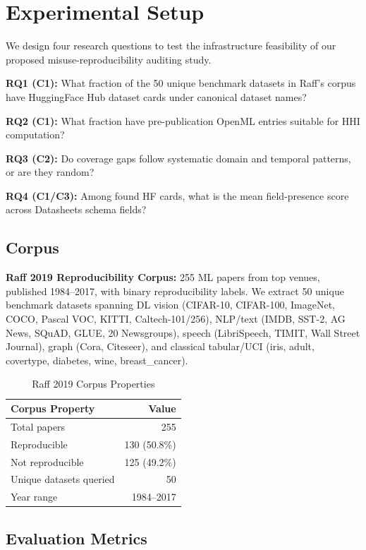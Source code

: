 \section{Experimental Setup}
\label{sec:experiments}

We design four research questions to test the infrastructure feasibility of our proposed misuse-reproducibility auditing study.

\textbf{RQ1 (C1):} What fraction of the 50 unique benchmark datasets in Raff's corpus have HuggingFace Hub dataset cards under canonical dataset names?

\textbf{RQ2 (C1):} What fraction have pre-publication OpenML entries suitable for HHI computation?

\textbf{RQ3 (C2):} Do coverage gaps follow systematic domain and temporal patterns, or are they random?

\textbf{RQ4 (C1/C3):} Among found HF cards, what is the mean field-presence score across Datasheets schema fields?

\subsection{Corpus}

\textbf{Raff 2019 Reproducibility Corpus:} 255 ML papers from top venues, published 1984--2017, with binary reproducibility labels. We extract 50 unique benchmark datasets spanning DL vision (CIFAR-10, CIFAR-100, ImageNet, COCO, Pascal VOC, KITTI, Caltech-101/256), NLP/text (IMDB, SST-2, AG News, SQuAD, GLUE, 20 Newsgroups), speech (LibriSpeech, TIMIT, Wall Street Journal), graph (Cora, Citeseer), and classical tabular/UCI (iris, adult, covertype, diabetes, wine, breast\_cancer).

\begin{table}[h]
\centering
\caption{Raff 2019 Corpus Properties}
\label{tab:corpus}
\begin{tabular}{@{}lr@{}}
\toprule
Corpus Property & Value \\
\midrule
Total papers & 255 \\
Reproducible & 130 (50.8\%) \\
Not reproducible & 125 (49.2\%) \\
Unique datasets queried & 50 \\
Year range & 1984--2017 \\
\bottomrule
\end{tabular}
\end{table}

\subsection{Evaluation Metrics}

